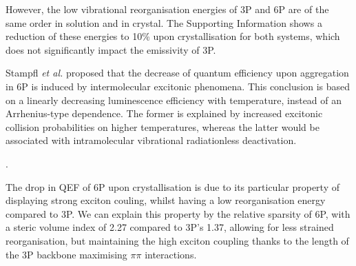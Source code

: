  However, the low vibrational reorganisation energies of 3P and 6P are of the same order in solution and in crystal. The Supporting Information shows a reduction of these energies to 10\% upon crystallisation for both systems, which does not significantly impact the emissivity of 3P.


Stampfl \textit{et al.} proposed that the decrease of quantum efficiency upon aggregation in 6P is induced by intermolecular excitonic phenomena.\cite{6P_qy} This conclusion is based on a linearly decreasing luminescence efficiency with temperature, instead of an Arrhenius-type dependence. The former is explained by increased excitonic collision probabilities on higher temperatures, whereas the latter would be associated with intramolecular vibrational radiationless deactivation.

.

 The drop in QEF of 6P upon crystallisation is due to its particular property of displaying strong exciton couling, whilst having a low reorganisation energy compared to 3P. We can explain this property by the relative sparsity of 6P, with a steric volume index of 2.27 compared to 3P's 1.37, allowing for less strained reorganisation, but maintaining the high exciton coupling thanks to the length of the 3P backbone maximising $\pi$\textendash$\pi$ interactions.

